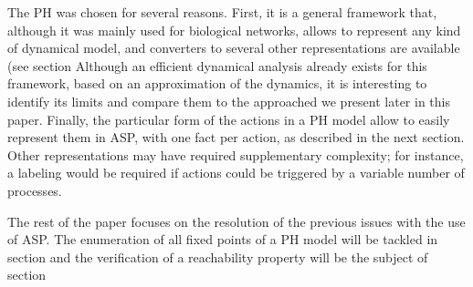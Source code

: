 \begin{definition}
\label{def:ConjointAction}

\end{definition}




The PH was chosen for several reasons.
First, it is a general framework that,
although it was mainly used for biological networks,
allows to represent any kind of dynamical model,
and converters to several other representations are available (see section%
Although an efficient dynamical analysis already exists for this framework,
based on an approximation of the dynamics,
it is interesting to identify its limits
and compare them to the approached we present later in this paper.
Finally, the particular form of the actions in a PH model allow
to easily represent them in ASP,
with one fact per action, as described in the next section.
Other representations may have required supplementary complexity;
for instance, a labeling would be required
if actions could be triggered by a variable number of processes.


The rest of the paper focuses on the resolution of the previous issues
with the use of ASP.
The enumeration of all fixed points of a PH model will be tackled in
section%
and the verification of a reachability property will be the subject of
section%

